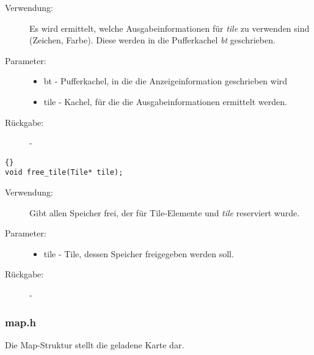 \documentclass[11pt,a4paper,notitlepage]{report}
\begin{document}
	\begin{description}
		\item[Verwendung:] Es wird ermittelt, welche Ausgabeinformationen für \textit{tile} zu verwenden sind (Zeichen, Farbe). Diese werden in die Pufferkachel \textit{bt} geschrieben.
		\item[Parameter:] \hfill
		\begin{itemize}
			\item bt - Pufferkachel, in die die Anzeigeinformation geschrieben wird
			\item tile - Kachel, für die die Ausgabeinformationen ermittelt werden.
		\end{itemize}
		\item[Rückgabe:] -
	\end{description}
	
		\begin{lstlisting}[caption=free\_tile]{}
void free_tile(Tile* tile);
		\end{lstlisting}
		
	\begin{description}
		\item[Verwendung:] Gibt allen Speicher frei, der für Tile-Elemente und \textit{tile} reserviert wurde.
		\item[Parameter:] \hfill
		\begin{itemize}
			\item tile - Tile, dessen Speicher freigegeben werden soll.
		\end{itemize}
		\item[Rückgabe:] -
	\end{description}
	
	\newpage
	\subsubsection*{map.h}
	Die Map-Struktur stellt die geladene Karte dar.
	
\end{document}
